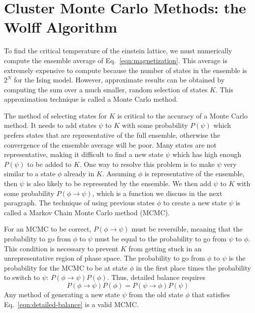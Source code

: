 \documentclass[amsmath,amssymb,aps,twocolumn,nofootinbib]{revtex4-2}
\begin{document}
\section{Cluster Monte Carlo Methods: the Wolff Algorithm}
\label{sec:wolff}

To find the critical temperature of the einstein lattice, we must numerically compute the ensemble average of Eq.~\ref{eqn:magnetization}. This average is extremely expensive to compute because the number of states in the ensemble is $2^N$ for the Ising model. However, approximate results can be obtained by computing the sum over a much smaller, random selection of states $K$. This approximation technique is called a Monte Carlo method.

The method of selecting states for $K$ is critical to the accuracy of a Monte Carlo method. It needs to add states $\psi$ to $K$ with some probability $P(\psi)$ which prefers states that are representative of the full ensemble, otherwise the convergence of the ensemble average will be poor. Many states are not representative, making it difficult to find a new state $\psi$ which has high enough $P(\psi)$ to be added to $K$. One way to resolve this problem is to make $\psi$ very similar to a state $\phi$ already in $K$. Assuming $\phi$ is representative of the ensemble, then $\psi$ is also likely to be represented by the ensemble. We then add $\psi$ to $K$ with some probability $P(\phi \rightarrow \psi)$, which is a function we discuss in the next paragraph. The technique of using previous states $\phi$ to create a new state $\psi$ is called a Markov Chain Monte Carlo method (MCMC).

For an MCMC to be correct, $P(\phi \rightarrow \psi)$ must be reversible, meaning that the probability to go from $\phi$ to $\psi$ must be equal to the probability to go from $\psi$ to $\phi$. This condition is necessary to prevent $K$ from getting stuck in an unrepresentative region of phase space. The probability to go from $\phi$ to $\psi$ is the probability for the MCMC to be at state $\phi$ in the first place times the probability to switch to $\psi$: $P(\phi \rightarrow \psi)P(\phi)$. Thus, detailed balance requires
\begin{equation}
  P(\phi \rightarrow \psi)P(\phi) = P(\psi \rightarrow \phi)P(\psi)
  \label{eqn:detailed-balance}
\end{equation}
Any method of generating a new state $\psi$ from the old state $\phi$ that satisfies Eq.~\ref{eqn:detailed-balance} is a valid MCMC.
\end{document}
